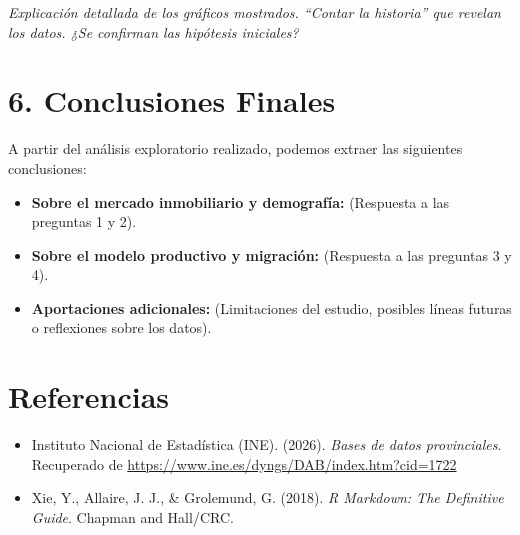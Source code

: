 \documentclass[data,article,submit,moreauthors,pdftex]{Definitions/mdpi}
\providecommand{\tightlist}{%
  \setlength{\itemsep}{0pt}\setlength{\parskip}{0pt}}
\begin{document}
\emph{Explicación detallada de los gráficos mostrados. ``Contar la
historia'' que revelan los datos. ¿Se confirman las hipótesis
iniciales?}

\section{6. Conclusiones Finales}\label{conclusiones-finales}

A partir del análisis exploratorio realizado, podemos extraer las
siguientes conclusiones:

\begin{itemize}
\tightlist
\item
  \textbf{Sobre el mercado inmobiliario y demografía:} (Respuesta a las
  preguntas 1 y 2).
\item
  \textbf{Sobre el modelo productivo y migración:} (Respuesta a las
  preguntas 3 y 4).
\item
  \textbf{Aportaciones adicionales:} (Limitaciones del estudio, posibles
  líneas futuras o reflexiones sobre los datos).
\end{itemize}

\newpage

\section{Referencias}\label{referencias}

\begin{itemize}
\tightlist
\item
  Instituto Nacional de Estadística (INE). (2026). \emph{Bases de datos
  provinciales}. Recuperado de
  \url{https://www.ine.es/dyngs/DAB/index.htm?cid=1722}
\item
  Xie, Y., Allaire, J. J., \& Grolemund, G. (2018). \emph{R Markdown:
  The Definitive Guide}. Chapman and Hall/CRC.
\end{itemize}


\vspace{6pt}


\end{document}
